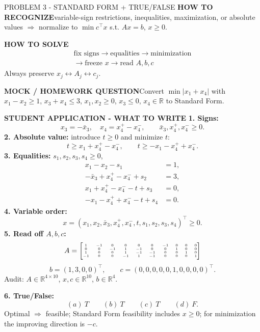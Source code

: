\documentclass[10pt,landscape]{article}
\newcommand{\R}{\mathbb{R}}
\newcommand{\recognize}{\textbf{HOW TO RECOGNIZE}\quad}
\newcommand{\procedure}{\textbf{HOW TO SOLVE}\quad}
\newcommand{\question}{\textbf{MOCK / HOMEWORK QUESTION}\quad}
\newcommand{\example}{\textbf{STUDENT APPLICATION - WHAT TO WRITE}\quad}
\begin{document}
%
\begin{minipage}[t]{0.327\textwidth}\vspace{0pt}
\begin{blk}{PROBLEM 3 - STANDARD FORM + TRUE/FALSE}
\recognize variable-sign restrictions, inequalities, maximization, or absolute values $\Rightarrow$ normalize to $\min c^\top x$ s.t. $Ax=b$, $x\ge0$.

\procedure
\[
\boxed{\begin{gathered}
\text{fix signs}\to\text{equalities}\to\text{minimization}\\[-1pt]
\to\text{freeze }x\to\text{read }A,b,c
\end{gathered}}
\]
Always preserve $x_j\leftrightarrow A_j\leftrightarrow c_j$.

\question Convert $\min|x_1+x_4|$ with $x_1-x_2\ge1$, $x_3+x_4\le3$, $x_1,x_2\ge0$, $x_3\le0$, $x_4\in\R$ to Standard Form.

\example
\textbf{1. Signs:}
\[
x_3=-\bar x_3,\quad x_4=x_4^+-x_4^-,\qquad \bar x_3,x_4^+,x_4^-\ge0.
\]
\textbf{2. Absolute value:} introduce $t\ge0$ and minimize $t$:
\[
t\ge x_1+x_4^+-x_4^-,\qquad t\ge-x_1-x_4^++x_4^-.
\]
\textbf{3. Equalities:} $s_1,s_2,s_3,s_4\ge0$,
\[
\begin{aligned}
x_1-x_2-s_1&=1,\\
-\bar x_3+x_4^+-x_4^-+s_2&=3,\\
x_1+x_4^+-x_4^- -t+s_3&=0,\\
-x_1-x_4^++x_4^- -t+s_4&=0.
\end{aligned}
\]
\textbf{4. Variable order:}
\[
\boxed{x=(x_1,x_2,\bar x_3,x_4^+,x_4^-,t,s_1,s_2,s_3,s_4)^\top\ge0}.
\]
\textbf{5. Read off $A,b,c$:}
\[
{\fontsize{4.85}{5.0}\selectfont
A=\begin{bmatrix}
1&-1&0&0&0&0&-1&0&0&0\\
0&0&-1&1&-1&0&0&1&0&0\\
1&0&0&1&-1&-1&0&0&1&0\\
-1&0&0&-1&1&-1&0&0&0&1
\end{bmatrix}}
\]
\[
b=(1,3,0,0)^\top,\qquad c=(0,0,0,0,0,1,0,0,0,0)^\top.
\]
Audit: $A\in\R^{4\times10}$, $x,c\in\R^{10}$, $b\in\R^4$.

\textbf{6. True/False:}
\[
\boxed{(a)\ T\qquad(b)\ T\qquad(c)\ T\qquad(d)\ F}.
\]
Optimal $\Rightarrow$ feasible; Standard Form feasibility includes $x\ge0$; for minimization the improving direction is $-c$.
\end{blk}
\end{minipage}

\newpage
\end{document}
